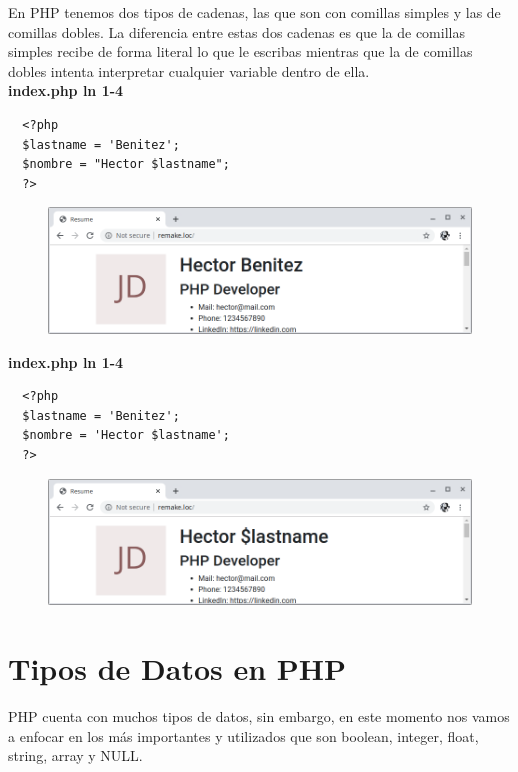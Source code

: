 \documentclass{article}
\begin{document}
En PHP tenemos dos tipos de cadenas, las que son con comillas simples y las de
comillas dobles. La diferencia entre estas dos cadenas es que la de comillas
simples recibe de forma literal lo que le escribas mientras que la de comillas
dobles intenta interpretar cualquier variable dentro de ella.\\


\textbf{index.php ln 1-4}
\begin{verbatim}
  <?php
  $lastname = 'Benitez';
  $nombre = "Hector $lastname";
  ?>
\end{verbatim}

\begin{figure}[h!]
  \centering
  \includegraphics[scale=0.5]{./Pictures/016_doble_comilla.png}
\end{figure}

\textbf{index.php ln 1-4}
\begin{verbatim}
  <?php
  $lastname = 'Benitez';
  $nombre = 'Hector $lastname';
  ?>
\end{verbatim}

\begin{figure}[h!]
  \centering
  \includegraphics[scale=0.5]{./Pictures/017_comilla_simple.png}
\end{figure}



\section{Tipos de Datos en PHP}%
PHP cuenta con muchos tipos de datos, sin embargo, en este momento nos vamos a
enfocar en los más importantes y utilizados que son boolean, integer, float,
string, array y NULL.\\
\end{document}
